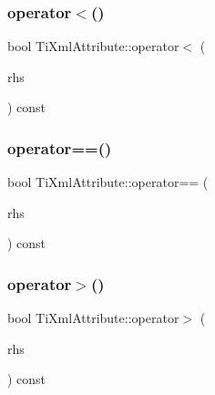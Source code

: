 \subsubsection{\texorpdfstring{operator$<$()}{operator<()}}
{\footnotesize\ttfamily bool Ti\+Xml\+Attribute\+::operator$<$ (\begin{DoxyParamCaption}\item[{const \hyperlink{class_ti_xml_attribute}{Ti\+Xml\+Attribute} \&}]{rhs }\end{DoxyParamCaption}) const\hspace{0.3cm}{\ttfamily [inline]}}

\mbox{\label{class_ti_xml_attribute_a51eef33c2cdd55831447af46be0baf8b}} 
\subsubsection{\texorpdfstring{operator==()}{operator==()}}
{\footnotesize\ttfamily bool Ti\+Xml\+Attribute\+::operator== (\begin{DoxyParamCaption}\item[{const \hyperlink{class_ti_xml_attribute}{Ti\+Xml\+Attribute} \&}]{rhs }\end{DoxyParamCaption}) const\hspace{0.3cm}{\ttfamily [inline]}}

\mbox{\label{class_ti_xml_attribute_a697c2dde7ac60fccaa7049cee906eb3e}} 
\subsubsection{\texorpdfstring{operator$>$()}{operator>()}}
{\footnotesize\ttfamily bool Ti\+Xml\+Attribute\+::operator$>$ (\begin{DoxyParamCaption}\item[{const \hyperlink{class_ti_xml_attribute}{Ti\+Xml\+Attribute} \&}]{rhs }\end{DoxyParamCaption}) const\hspace{0.3cm}{\ttfamily [inline]}}

\mbox{\label{class_ti_xml_attribute_ad62774421b814894b995af3b5d231dda}} 
